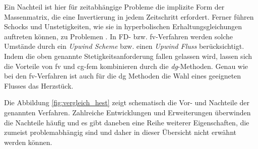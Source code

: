 Ein Nachteil ist hier für zeitabhängige Probleme die implizite Form der Massenmatrix, die eine Invertierung in jedem Zeitschritt erfordert. Ferner führen Schocks und Unstetigkeiten, wie sie in hyperbolischen Erhaltungsgleichungen auftreten können, zu Problemen \cite{dolejvsi2015discontinuous}. In FD- bzw. \ac{fv}-Verfahren werden solche Umstände durch ein \emph{Upwind Scheme} bzw. einen \emph{Upwind Fluss} berücksichtigt. Indem die oben genannte Stetigkeitsanforderung fallen gelassen wird, lassen sich die Vorteile von \ac{fv} und \ac{cg}-\ac{fem} kombinieren durch die \emph{\ac{dg}}-Methoden. Genau wie bei den \ac{fv}-Verfahren ist auch für die \ac{dg} Methoden die Wahl eines geeigneten Flusses das Herzstück.

Die Abbildung \ref{fig:vergleich_hest} zeigt schematisch die Vor- und Nachteile der genannten Verfahren. Zahlreiche Entwicklungen und Erweiterungen überwinden die Nachteile häufig und es gibt daneben eine Reihe weiterer Eigenschaften, die zumeist problemabhängig sind und daher in dieser Übersicht nicht erwähnt werden können.

